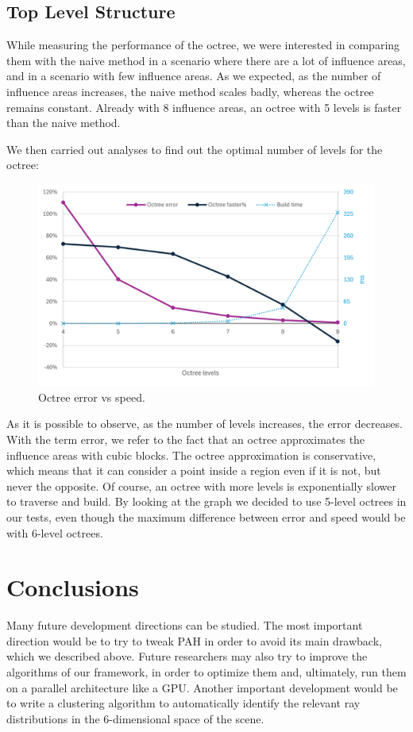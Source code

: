 \documentclass[11pt,a4paper,twocolumn]{article}
\begin{document}
\subsection{Top Level Structure}
While measuring the performance of the octree, we were interested in comparing them with the naive method in a scenario where there are a lot of influence areas, and in a scenario with few influence areas. As we expected, as the number of influence areas increases, the naive method scales badly, whereas the octree remains constant. Already with 8 influence areas, an octree with 5 levels is faster than the naive method.

We then carried out analyses to find out the optimal number of levels for the octree:

\begin{figure}[H]
    \centering
    \includegraphics[width=\textwidth*\real{0.47}]{Images/octree_error_faster_chart.png}
    \caption{Octree error vs speed.}
    \label{fig:octree_levels}
\end{figure}

As it is possible to observe, as the number of levels increases, the error decreases. With the term error, we refer to the fact that an octree approximates the influence areas with cubic blocks. The octree approximation is conservative, which means that it can consider a point inside a region even if it is not, but never the opposite. Of course, an octree with more levels is exponentially slower to traverse and build. By looking at the graph we decided to use 5-level octrees in our tests, even though the maximum difference between error and speed would be with 6-level octrees.

\section{Conclusions}
Many future development directions can be studied. The most important direction would be to try to tweak PAH in order to avoid its main drawback, which we described above. Future researchers may also try to improve the algorithms of our framework, in order to optimize them and, ultimately, run them on a parallel architecture like a GPU. Another important development would be to write a clustering algorithm to automatically identify the relevant ray distributions in the 6-dimensional space of the scene.
\end{document}
